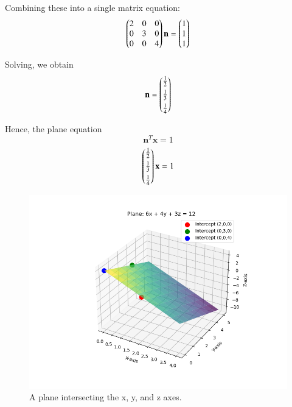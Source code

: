\documentclass[journal]{IEEEtran}
\begin{document}
Combining these into a single matrix equation:
\[
\begin{pmatrix}
    2 & 0 & 0 \\
    0 & 3 & 0 \\
    0 & 0 & 4
\end{pmatrix}
\mathbf{n}
=
\begin{pmatrix}1\\1\\1\end{pmatrix}
\]

Solving, we obtain
\[
\mathbf{n} = 
\begin{pmatrix}\tfrac{1}{2}\\[4pt]\tfrac{1}{3}\\[4pt]\tfrac{1}{4}\end{pmatrix}
\]

Hence, the plane equation 
\[
\mathbf{n}^T \mathbf{x} = 1 
\]
\[
\begin{pmatrix}\tfrac{1}{2}\\[4pt]\tfrac{1}{3}\\[4pt]\tfrac{1}{4}\end{pmatrix}\mathbf{x} =1
\]

\begin{figure}[H]
\begin{center}
\includegraphics[width=0.7\columnwidth]{figs/fig2.png}
\end{center}
\caption{A plane intersecting the x, y, and z axes.}
\label{fig:Fig.1}
\end{figure}
\end{document}
